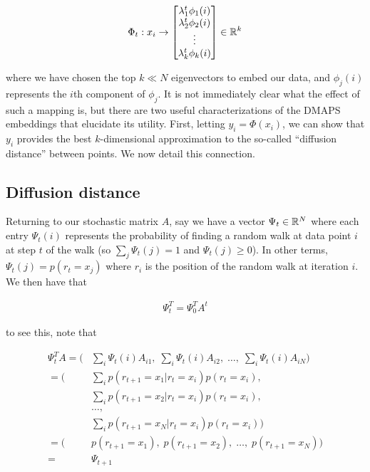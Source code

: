 \begin{align}
  \Phi_t: x_i \rightarrow \begin{bmatrix} \lambda_1^t \phi_1(i) \\ \lambda_2^t
    \phi_2(i) \\ \vdots \\ \lambda_k^t \phi_k(i) \end{bmatrix} \in \mathbb{R}^k
\end{align}

where we have chosen the top $k \ll N$ eigenvectors to embed our data,
and $\phi_j(i)$ represents the $i$th component of $\phi_j$. It is not
immediately clear what the effect of such a mapping is, but there are
two useful characterizations of the DMAPS embeddings that elucidate
its utility. First, letting $y_i = \Phi(x_i)$, we can show that $y_i$
provides the best $k$-dimensional approximation to the so-called
``diffusion distance'' between points. We now detail this connection.

\subsection{Diffusion distance}

Returning to our stochastic matrix $A$, say we have a vector
$\Psi_t \in \mathbb{R}^N$ where each entry $\Psi_t(i)$ represents the
probability of finding a random walk at data point $i$ at step $t$ of
the walk (so $\sum_j \Psi_t(j) = 1$ and $\Psi_t(j) \ge 0$). In other
terms, $\Psi_t(j) = p(r_t = x_j)$ where $r_i$ is the position of the
random walk at iteration $i$. We then have that

\begin{align}
  \Psi_t^T = \Psi_0^T A^t
\end{align}

to see this, note that

\begin{align*}
  \Psi_t^T A = \big( &\sum_i \Psi_t(i) A_{i1},\; \sum_i
                         \Psi_t(i) A_{i2},\; \dots,\; \sum_i \Psi_t(i) A_{iN} \big) \\
             = \bigg( &\sum_i p(r_{t+1} = x_1 | r_t = x_i)p(r_t = x_i) , \\
             & \sum_i p(r_{t+1} = x_2 | r_t = x_i)p(r_t = x_i), \\
             & \dots, \\
                     & \sum_i p(r_{t+1} = x_N | r_t = x_i)p(r_t = x_i)
                       \bigg) \\
  = \bigg( & p(r_{t+1} = x_1), \;p(r_{t+1} = x_2), \; \dots, \;
             p(r_{t+1} = x_N) \bigg) \\
  = & \Psi_{t+1}
\end{align*}

